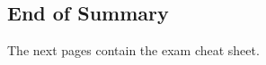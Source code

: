 \documentclass[\fontheight]{extarticle}
\begin{document}
\begin{multicols*}{3}
    
    
    
    
    
    
    \newpage
    
    
    \section[][darkRed]{End of Summary}
    The next pages contain the exam cheat sheet.
    \newpage
    \setcounter{section}{0}
    \setcounter{page}{1}
    
    
    
    
    
    
    
    
    
\end{multicols*}
\end{document}
